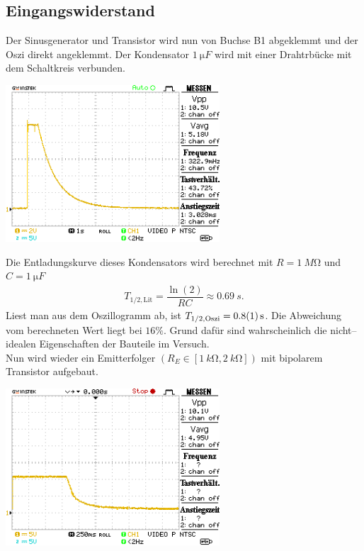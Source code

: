 \documentclass[10pt]{article}
\newenvironment{Figure}
  {\par\medskip\noindent\minipage{\linewidth}}
  {\endminipage\par\medskip}
\begin{document}
\begin{multicols}{2}
        \subsection{Eingangswiderstand}
        Der Sinusgenerator und Transistor wird nun von Buchse B1 abgeklemmt und der Oszi direkt angeklemmt.
        Der Kondensator $\SI{1}{\micro F}$ wird mit einer Drahtrbücke mit dem Schaltkreis verbunden.
        \begin{Figure}
                \centering
                \includegraphics[width=0.6\textwidth]{../data/DS0015.png}
        \end{Figure}
        Die Entladungskurve dieses Kondensators wird berechnet mit $R=\SI{1}{M\ohm}$ und $C=\SI{1}{\micro F}$ 
        \begin{align} 
                T_{1/2,\text{Lit}}=\dfrac{\ln\left(2\right)}{RC}\approx \SI{0.69}{s}
        .\end{align} 
        Liest man aus dem Oszillogramm ab, ist $T_{1/2,\text{Oszi}}=\SI{0.8+-0.1}{s}$.
        Die Abweichung vom berechneten Wert liegt bei $16\%$.
        Grund dafür sind wahrscheinlich die nicht--idealen Eigenschaften der Bauteile im Versuch.
        \\\indent Nun wird wieder ein Emitterfolger $\left(R_E \in \left[\SI{1}{k\ohm},\SI{2}{k\ohm}\right]\right)$ mit bipolarem Transistor aufgebaut. 
        \begin{Figure}
                \centering
                \includegraphics[width=0.6\textwidth]{../data/DS0017.png}

\end{Figure}
\end{multicols}
\end{document}
